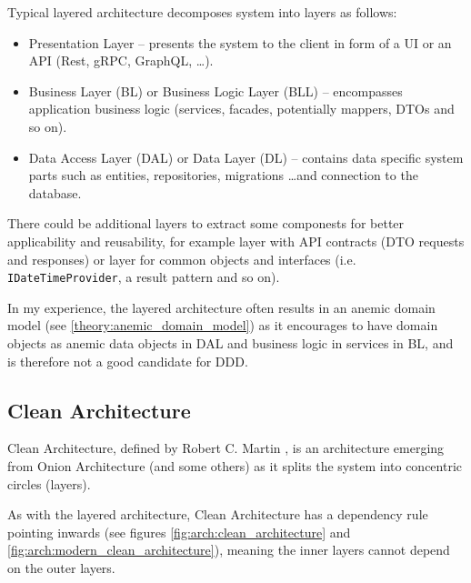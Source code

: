 Typical layered architecture decomposes system into layers as follows:
\begin{itemize}
    \item Presentation Layer -- presents the system to the client in form of a UI or an API (Rest, gRPC, GraphQL, \dots).
    \item Business Layer (BL) or Business Logic Layer (BLL) -- encompasses application business logic (services, facades, potentially mappers, DTOs and so on).
    \item Data Access Layer (DAL) or Data Layer (DL) -- contains data specific system parts such as entities, repositories, migrations \dots and connection to the database.
\end{itemize}

There could be additional layers to extract some componests for better applicability and reusability, for example layer with API contracts (DTO requests and responses) or layer for common objects and interfaces (i.e. \texttt{IDateTimeProvider}, a result pattern and so on).  

In my experience, the layered architecture often results in an anemic domain model (see \ref{theory:anemic_domain_model}) as it encourages to have domain objects as anemic data objects in DAL and business logic in services in BL, and is therefore not a good candidate for DDD.

\subsection{Clean Architecture}
\label{theory:clean_architecture}
Clean Architecture, defined by Robert C. Martin \cite{robert_martin:clean_architecture}, is an architecture emerging from Onion Architecture (and some others) as it splits the system into concentric circles (layers).

As with the layered architecture, Clean Architecture has a dependency rule pointing inwards (see figures \ref{fig:arch:clean_architecture} and \ref{fig:arch:modern_clean_architecture}), meaning the inner layers cannot depend on the outer layers.


